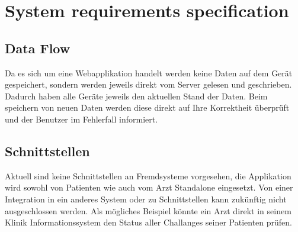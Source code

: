 \chapter{System requirements specification}
\section{Data Flow}
Da es sich um eine Webapplikation handelt werden keine Daten auf dem Gerät gespeichert, sondern werden jeweils direkt vom Server gelesen und geschrieben. Dadurch haben alle Geräte jeweils den aktuellen Stand der Daten. Beim speichern von neuen Daten werden diese direkt auf Ihre Korrektheit überprüft und der Benutzer im Fehlerfall informiert.
\section{Schnittstellen}
Aktuell sind keine Schnittstellen an Fremdsysteme vorgesehen, die Applikation wird sowohl von Patienten wie auch vom Arzt Standalone eingesetzt. Von einer Integration in ein anderes System oder zu Schnittstellen kann zukünftig nicht ausgeschlossen werden. Als mögliches Beispiel könnte ein Arzt direkt in seinem Klinik Informationssystem den Status aller Challanges seiner Patienten prüfen.